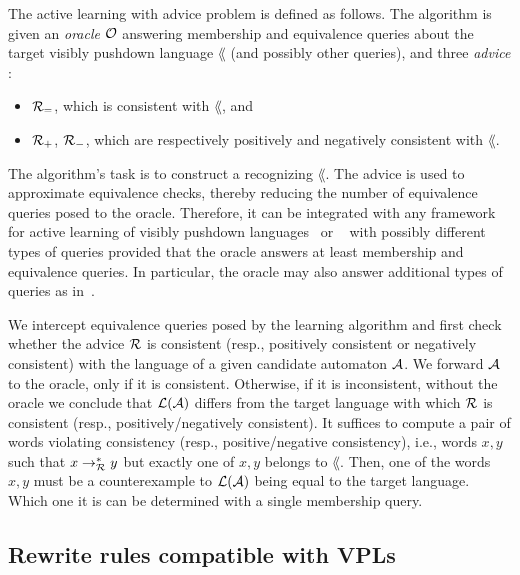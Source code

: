 The active \DVPA learning with advice problem is defined as follows.
The algorithm is given an \emph{oracle} $\mathcal{O}$ answering membership and equivalence queries about the target visibly pushdown language $\lang$
 (and possibly other queries), and three \emph{advice} \SRSs:
 \begin{itemize}
 \item  $\mathcal{R}_{=}$, which is consistent with $\lang$, and 
 \item $\mathcal{R}_{+}$, $\mathcal{R}_{-}$, which are respectively positively and negatively consistent with $\lang$.
\end{itemize}  
The algorithm's task is to construct a \DVPA recognizing $\lang$. 
The advice is used to approximate equivalence checks, thereby reducing the number of equivalence queries posed to the oracle.
Therefore, it can be integrated with any framework for active learning of visibly pushdown languages~\cite{DBLP:conf/icgi/BarbotBFHKLN0Y21,DBLP:journals/pacmpl/JiaT24} or \DVPA~\cite{mfcs22} with possibly different types of queries 
provided that the oracle answers at least  membership and equivalence queries.
In particular, the oracle may also answer additional types of queries as in~\cite{mfcs22}.


We intercept  equivalence queries posed by the learning algorithm and first check whether the advice \SRS $\mathcal{R}$ is consistent (resp., positively consistent or negatively consistent) with
the language of a given candidate automaton $\mathcal{A}$. 
We forward $\mathcal{A}$ to the oracle, only if it is consistent.
Otherwise, if it is inconsistent, without the oracle we conclude that $\mathcal{L}(\mathcal{A})$ differs from the target language with which $\mathcal{R}$ is consistent (resp., positively/negatively consistent).
It suffices to compute a pair of words violating consistency (resp., positive/negative consistency), i.e., 
words $x,y$ such that $x \rightarrow^*_{\mathcal{R}} y$ but exactly one of $x,y$ belongs to $\lang$.
Then, one of the words $x, y$ must be a counterexample to $\mathcal{L}(\mathcal{A})$ being equal to the target language. 
Which one it is can be determined with a single membership query.


\subsection{Rewrite rules compatible with VPLs}

